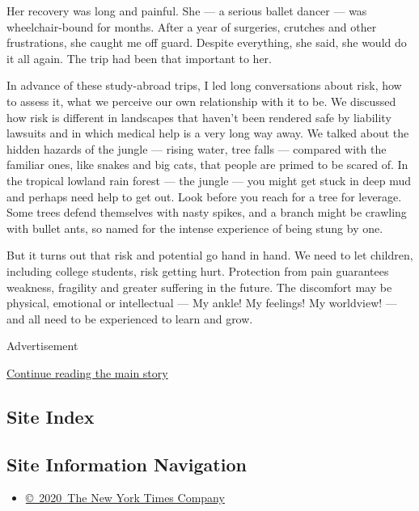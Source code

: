Her recovery was long and painful. She --- a serious ballet dancer ---
was wheelchair-bound for months. After a year of surgeries, crutches and
other frustrations, she caught me off guard. Despite everything, she
said, she would do it all again. The trip had been that important to
her.

In advance of these study-abroad trips, I led long conversations about
risk, how to assess it, what we perceive our own relationship with it to
be. We discussed how risk is different in landscapes that haven't been
rendered safe by liability lawsuits and in which medical help is a very
long way away. We talked about the hidden hazards of the jungle ---
rising water, tree falls --- compared with the familiar ones, like
snakes and big cats, that people are primed to be scared of. In the
tropical lowland rain forest --- the jungle --- you might get stuck in
deep mud and perhaps need help to get out. Look before you reach for a
tree for leverage. Some trees defend themselves with nasty spikes, and a
branch might be crawling with bullet ants, so named for the intense
experience of being stung by one.

But it turns out that risk and potential go hand in hand. We need to let
children, including college students, risk getting hurt. Protection from
pain guarantees weakness, fragility and greater suffering in the future.
The discomfort may be physical, emotional or intellectual --- My ankle!
My feelings! My worldview! --- and all need to be experienced to learn
and grow.

Advertisement

\protect\hyperlink{after-bottom}{Continue reading the main story}

\hypertarget{site-index}{%
\subsection{Site Index}\label{site-index}}

\hypertarget{site-information-navigation}{%
\subsection{Site Information
Navigation}\label{site-information-navigation}}

\begin{itemize}
\tightlist
\item
  \href{https://help.nytimes3xbfgragh.onion/hc/en-us/articles/115014792127-Copyright-notice}{©~2020~The
  New York Times Company}
\end{itemize}

